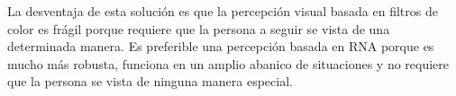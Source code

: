 \begin{itemize}
	La desventaja de esta solución es que la percepción visual basada en filtros de color es frágil porque requiere que la persona a seguir se vista de una determinada manera. Es preferible una percepción basada en RNA porque es mucho más robusta, funciona en un amplio abanico de situaciones y no requiere que la persona se vista de ninguna manera especial.
\end{itemize}


